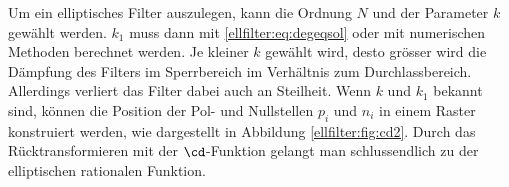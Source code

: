 Um ein elliptisches Filter auszulegen, kann die Ordnung $N$ und der Parameter $k$ gewählt werden.
$k_1$ muss dann mit \eqref{ellfilter:eq:degeqsol} oder mit numerischen Methoden berechnet werden.
Je kleiner $k$ gewählt wird, desto grösser wird die Dämpfung des Filters im Sperrbereich im Verhältnis zum Durchlassbereich.
Allerdings verliert das Filter dabei auch an Steilheit.
Wenn $k$ und $k_1$ bekannt sind, können die Position der Pol- und Nullstellen $p_i$ und $n_i$ in einem Raster konstruiert werden, wie dargestellt in Abbildung \ref{ellfilter:fig:cd2}.
Durch das Rücktransformieren mit der $\cd$-Funktion gelangt man schlussendlich zu der elliptischen rationalen Funktion. %


